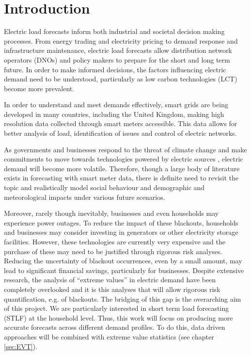 
\chapter{Introduction}

Electric load forecasts inform both industrial and societal decision making processes. From energy trading and electricity pricing to demand response and infrastructure maintenance,  electric load forecasts allow distribution network operators (DNOs) and policy makers to prepare for the short and long term future. In order to make informed decisions, the factors influencing electric demand need to be understood, particularly as low carbon technologies (LCT) become more prevalent. 

In order to understand and meet demands effectively, smart grids are being developed in many countries, including the United Kingdom, making high resolution data collected through smart meters accessible. This data allows for better analysis of load, identification of issues and control of electric networks. 

As governments and businesses respond to the threat of climate change and make commitments to move towards technologies powered by electric sources \citep{fuelban}, electric demand will become more volatile. Therefore, though a large body of literature exists in forecasting with smart meter data, there is definite need to revisit the topic and realistically model social behaviour and demographic and meteorological impacts under various future scenarios.

Moreover, rarely though inevitably, businesses and even households may experience power outages. To reduce the impact of these blackouts, households and businesses may consider investing in generators or other electricity storage facilities. However, these technologies are currently very expensive and the purchase of these may need to be justified through rigorous risk analyses. Reducing the uncertainty of blackout occurrences, even by a small amount, may lead to significant financial savings, particularly for businesses. Despite extensive research, the analysis of ``extreme values'' in electric demand have been completely overlooked and it is this analyses that will allow rigorous risk quantification, e.g. of blackouts. The bridging of this gap is the overarching aim of this project. We are particularly interested in short term load forecasting (STLF) at the household level. Thus, this work will focus on producing more accurate forecasts across different demand profiles. To do this, data driven approaches will be combined with extreme value statistics (see chapter \ref{sec:EVT}).

